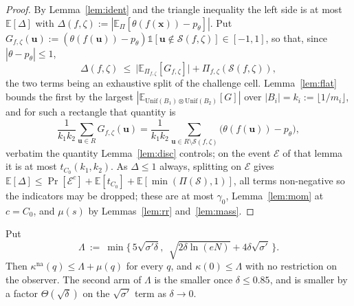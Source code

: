 \documentclass{aicr-solution}
\newcommand{\Prob}[1]{\Pr\!\left[#1\right]}
\newcommand{\Exp}{\mathbb{E}}
\newcommand{\vx}{\mathbf{x}}
\newcommand{\vu}{\mathbf{u}}
\newcommand{\ind}{\mathbb{1}}
\newcommand{\Unif}{\mathrm{Unif}}
\newcommand{\kna}{\kappa^{\mathrm{na}}}
\begin{document}
\begin{proof}
By Lemma~\ref{lem:ident} and the triangle inequality the left side is at most
$\Exp[\Delta]$ with
$\Delta(f,\zeta):=|\Exp_{\Pi}[\theta(f(\vx))-p_\theta]|$. Put
$G_{f,\zeta}(\vu):=(\theta(f(\vu))-p_\theta)\ind[\vu\notin\mathcal S(f,\zeta)]\in[-1,1]$,
so that, since $|\theta-p_\theta|\le1$,
\[
  \Delta(f,\zeta)\ \le\ \bigl|\Exp_{\Pi_{f,\zeta}}[G_{f,\zeta}]\bigr|
  +\Pi_{f,\zeta}(\mathcal S(f,\zeta)),
\]
the two terms being an exhaustive split of the challenge cell. Lemma~\ref{lem:flat}
bounds the first by the largest $|\Exp_{\Unif(B_1)\otimes\Unif(B_2)}[G]|$ over
$|B_i|=k_i:=\lfloor1/m_i\rfloor$, and for such a rectangle that quantity is
\[
  \frac{1}{k_1k_2}\sum_{\vu\in R}G_{f,\zeta}(\vu)
  =\frac{1}{k_1k_2}\sum_{\vu\in R\setminus\mathcal S(f,\zeta)}\bigl(\theta(f(\vu))-p_\theta\bigr),
\]
verbatim the quantity Lemma~\ref{lem:disc} controls; on the event $\mathcal E$ of
that lemma it is at most $t_{C_0}(k_1,k_2)$. As $\Delta\le1$ always, splitting on
$\mathcal E$ gives
$\Exp[\Delta]\le\Prob{\mathcal E^{c}}+\Exp[t_{C_0}]+\Exp[\min(\Pi(\mathcal S),1)]$,
all terms non-negative so the indicators may be dropped; these are at most
$\gamma_0$, Lemma~\ref{lem:mom} at $c=C_0$, and $\mu(s)$ by Lemmas~\ref{lem:rr}
and~\ref{lem:mass}.
\end{proof}

\begin{theorem}\label{thm:A}
Put
\[
  \Lambda\ :=\ \min\bigl\{\,5\sqrt{\sigma'\delta},\ \ \sqrt{2\delta\ln(eN)}
  +4\delta\sqrt{\sigma'}\,\bigr\}.
\]
Then $\kna(q)\le\Lambda+\mu(q)$ for every $q$, and $\kappa(0)\le\Lambda$ with no
restriction on the observer. The second arm of $\Lambda$ is the smaller once $\delta\le0.85$, and is smaller by
a factor $\Theta(\sqrt\delta)$ on the $\sqrt{\sigma'}$ term as $\delta\to0$.
\end{theorem}
\end{document}

